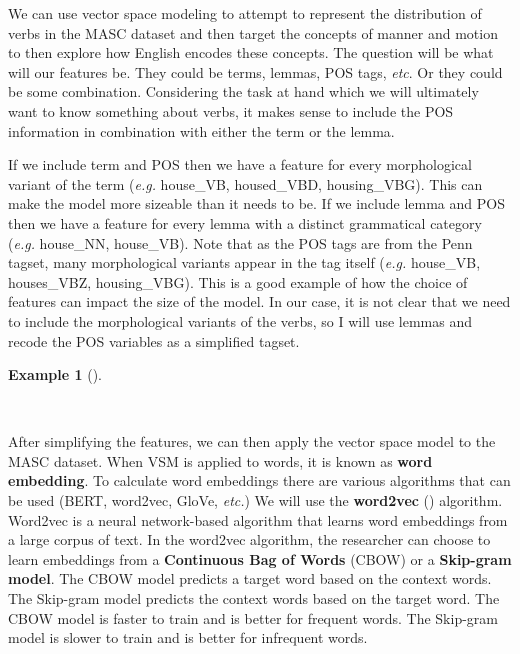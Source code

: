 \documentclass[
  letterpaper,
]{latex/krantz}
\theoremstyle{definition}
\newtheorem{example}{Example}[chapter]
\theoremstyle{remark}
\begin{document}
We can use vector space modeling to attempt to represent the
distribution of verbs in the MASC dataset and then target the concepts
of manner and motion to then explore how English encodes these concepts.
The question will be what will our features be. They could be terms,
lemmas, POS tags, \emph{etc}. Or they could be some combination.
Considering the task at hand which we will ultimately want to know
something about verbs, it makes sense to include the POS information in
combination with either the term or the lemma.

If we include term and POS then we have a feature for every
morphological variant of the term (\emph{e.g.} house\_VB, housed\_VBD,
housing\_VBG). This can make the model more sizeable than it needs to
be. If we include lemma and POS then we have a feature for every lemma
with a distinct grammatical category (\emph{e.g.} house\_NN, house\_VB).
Note that as the POS tags are from the Penn tagset, many morphological
variants appear in the tag itself (\emph{e.g.} house\_VB, houses\_VBZ,
housing\_VBG). This is a good example of how the choice of features can
impact the size of the model. In our case, it is not clear that we need
to include the morphological variants of the verbs, so I will use lemmas
and recode the POS variables as a simplified tagset.

\begin{example}[]\protect\hypertarget{exm-eda-masc-vsm-lemma-pos}{}\label{exm-eda-masc-vsm-lemma-pos}

~

\end{example}

After simplifying the features, we can then apply the vector space model
to the MASC dataset. When VSM is applied to words, it is known as
\textbf{word embedding}. To calculate word embeddings there are various
algorithms that can be used (BERT, word2vec, GloVe, \emph{etc.}) We will
use the \textbf{word2vec} () algorithm. Word2vec is a neural network-based algorithm that
learns word embeddings from a large corpus of text. In the word2vec
algorithm, the researcher can choose to learn embeddings from a
\textbf{Continuous Bag of Words} (CBOW) or a \textbf{Skip-gram model}.
The CBOW model predicts a target word based on the context words. The
Skip-gram model predicts the context words based on the target word. The
CBOW model is faster to train and is better for frequent words. The
Skip-gram model is slower to train and is better for infrequent words.
\end{document}
